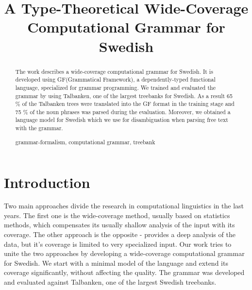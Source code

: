 \documentclass[runningheads,a4paper]{llncs}
\newcommand{\keywords}[1]{\par\addvspace\baselineskip
\noindent\keywordname\enspace\ignorespaces#1}
\begin{document}
\mainmatter  %

\title{A Type-Theoretical Wide-Coverage Computational Grammar for Swedish}

\author{}
\institute{}


\maketitle


\begin{abstract}
The work describes a wide-coverage computational grammar for Swedish. 
It is developed using GF(Grammatical Framework), a dependently-typed 
functional language, specialized for grammar programming. We trained
and evaluated the grammar by using Talbanken, one of the largest treebanks for 
Swedish. As a result 65 $\%$ of the Talbanken trees were translated
into the GF format in the training stage and 75 \% of the noun phrases
was parsed during the evaluation. Moreover, we obtained a language
model for Swedish which we use for disambiguation when parsing free text
with the grammar. 
\keywords{grammar-formalism, computational grammar, treebank}
\end{abstract}


\section{Introduction}




Two main approaches divide the research in computational linguistics
in the last years. The first one is the wide-coverage method, usually based on
statistics methods, which compensates its usually shallow analysis of the
input with its coverage. The other approach is the opposite - provides
a deep analysis of the data, but it's coverage is limited to
very specialized input. Our work tries to unite the two approaches by
developing a wide-coverage computational grammar for Swedish. We start
with a minimal model of the language and extend its coverage
significantly, without affecting the quality. The grammar was
developed and evaluated against Talbanken\cite{talbanken}, one of the
largest Swedish treebanks. 
\end{document}
